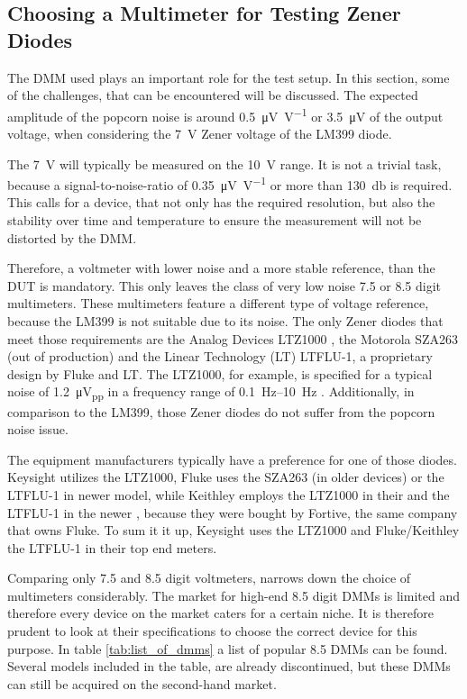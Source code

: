 \subsection{Choosing a Multimeter for Testing Zener Diodes}
The DMM used plays an important role for the test setup. In this section, some of the challenges, that can be encountered will be discussed. The expected amplitude of the popcorn noise is around \qty[per-mode=symbol]{0.5}{\micro\volt \per \volt} or \qty{3.5}{\micro\volt} of the output voltage, when considering the \qty{7}{\volt} Zener voltage of the LM399 diode.

The \qty{7}{\volt} will typically be measured on the \qty{10}{\volt} range. It is not a trivial task, because a signal-to-noise-ratio of \qty[per-mode=symbol]{0.35}{\micro\volt \per \volt} or more than \qty{130}{\decibel} is required. This calls for a device, that not only has the required resolution, but also the stability over time and temperature to ensure the measurement will not be distorted by the DMM.

Therefore, a voltmeter with lower noise and a more stable reference, than the DUT is mandatory. This only leaves the class of very low noise \num{7.5} or \num{8.5} digit multimeters. These multimeters feature a different type of voltage reference, because the LM399 is not suitable due to its noise. The only Zener diodes that meet those requirements are the Analog Devices LTZ1000 \cite{datasheet_LTZ1000}, the Motorola SZA263 (out of production) and the Linear Technology (LT) LTFLU-1, a proprietary design by Fluke and LT. The LTZ1000, for example, is specified for a typical noise of \qty{1.2}{\micro\volt_{pp}} in a frequency range of \qtyrange{0.1}{10}{\Hz} \cite{datasheet_LTZ1000}. Additionally, in comparison to the LM399, those Zener diodes do not suffer from the popcorn noise issue.

The equipment manufacturers typically have a preference for one of those diodes. Keysight utilizes the LTZ1000, Fluke uses the SZA263 (in older devices) or the LTFLU-1 in newer model, while Keithley employs the LTZ1000 in their  and the LTFLU-1 in the newer , because they were bought by Fortive, the same company that owns Fluke. To sum it it up, Keysight uses the LTZ1000 and Fluke/Keithley the LTFLU-1 in their top end meters.

Comparing only \num{7.5} and \num{8.5} digit voltmeters, narrows down the choice of multimeters considerably. The market for high-end \num{8.5} digit DMMs is limited and therefore every device on the market caters for a certain niche. It is therefore prudent to look at their specifications to choose the correct device for this purpose. In table \ref{tab:list_of_dmms} a list of popular \num{8.5} DMMs can be found. Several models included in the table, are already discontinued, but these DMMs can still be acquired on the second-hand market.

